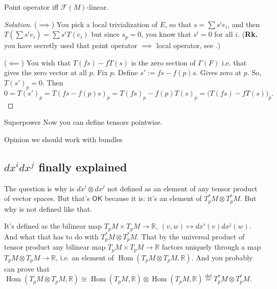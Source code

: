 \begin{exercise}\leavevmode
Point operator iff \(\mathcal{F}(M)\)-linear.
\end{exercise}

\begin{proof}[Solution]\leavevmode
(\(\implies\)) You pick a local trivialization of \(E\), so that \(s=\sum s^ie_i\), and then
\(T\left(\sum s^ie_i\right)=\sum s^i T(e_i)\) but since \(s_p=0\), you know that \(s^i=0\) for all \(i\). (\textbf{Rk.}  you have secretly used that point operator \(\implies\) local operator, see \cite{tud}.)

(\(\impliedby\)) You wish that \(T(fs)-fT(s)\) is the zero section of  \(\Gamma(F)\) i.e. that gives the zero vector at all \(p\). Fix \(p\). Define \(s':=fs - f(p)s\). Gives zero at \(p\). So, \(T(s')_p=0\). Then
 \[0=T(s')_p=T(fs-f(p)s)_p=T(fs)_p-f(p)T(s)_p=\Big(T(fs)-fT(s)\Big)_p.\]

\end{proof}

\begin{thing8}{Superpower}\leavevmode
Now you can define tensors pointwise.
\end{thing8}

\begin{thing6}{Opinion}\leavevmode
we should work with bundles
\end{thing6}

\subsection{\(dx^idx^j\) finally explained}

The question is why is \(dx^i  \otimes dx^j\) not defined as an element of any tensor product of vector spaces. But that's  $\mathsf{OK}$ because it is: it's an element of \(T_p^*M\otimes T^*_pM\). But why is not defined like that.

It's defined as the bilinear map \(T_pM \times T_pM\to \mathbb{R}\), \((v,w)\mapsto dx^i(v)dx^j(w)\). And what that has to do with \(T_p ^*M\otimes T_p ^*M\). That by the universal product of tensor product any bilinear map \(T_pM \times T_pM\to \mathbb{R}\) factors uniquely through a map \(T_pM \otimes T_pM \to \mathbb{R}\), i.e. an element of \(\operatorname{Hom}(T_pM \otimes T_pM, \mathbb{R})\). And you probably can prove that \(\operatorname{Hom}(T_pM \otimes T_p M, \mathbb{R})\cong \operatorname{Hom}(T_pM,\mathbb{R})\otimes \operatorname{Hom}(T_pM, \mathbb{R})\overset{\operatorname{def}}{=}T_p ^*M \otimes T^*_pM\).

